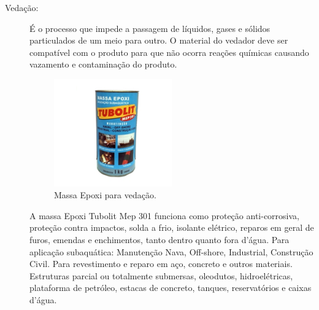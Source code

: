 \begin{description}
\item[Vedação:] É o processo que impede a passagem de líquidos, gases e
sólidos particulados de um meio para outro. O material do vedador deve ser
compatível com o produto para que não ocorra reações químicas causando vazamento
e contaminação do produto.
\par
\begin{figure}[h]
  \centering
  \includegraphics[width=0.5\textwidth]{figures/haha.png}
  \caption{Massa Epoxi para vedação.}
  \label{fig:haha}
\end{figure}
\FloatBarrier
\par
A massa Epoxi Tubolit Mep 301 funciona como proteção anti-corrosiva, proteção
contra impactos, solda a frio, isolante elétrico, reparos em geral de furos,
emendas e enchimentos, tanto dentro quanto fora d’água. Para aplicação
subaquática: Manutenção Nava, Off-shore, Industrial, Construção Civil. Para
revestimento e reparo em aço, concreto e outros materiais. Estruturas parcial
ou totalmente submersas, oleodutos, hidroelétricas, plataforma de petróleo,
estacas de concreto, tanques, reservatórios e caixas d'água.
\end{description}